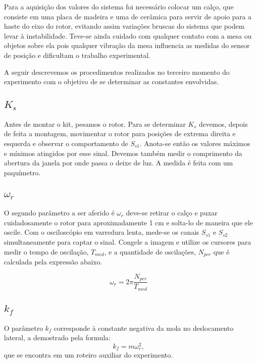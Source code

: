 Para a aquisição dos valores do sistema foi necessário colocar um calço, que consiste em uma placa de madeira e uma de cerâmica para servir de apoio para a haste do eixo do rotor, evitando assim variações bruscas do sistema que podem levar à instabilidade. Teve-se ainda cuidado com qualquer contato com a mesa ou objetos sobre ela pois qualquer vibração da mesa influencia as medidas do sensor de posição e dificultam o trabalho experimental.

A seguir descrevemos os procedimentos realizados no terceiro momento
do experimento com o objetivo de se determinar as constantes envolvidas.

\subsection{$K_s$}



Antes de montar o kit, pesamos o rotor.
Para se determinar $K_s$ devemos, depois de feita a montagem, movimentar o rotor para posições de extrema direita e esquerda e observar o comportamento de $S_{s1}$. Anota-se então os valores máximos e mínimos atingidos por esse sinal. Devemos também medir
o comprimento da abertura da janela por onde passa o deixe de luz.
A medida é feita com um paquímetro.

\subsection{\texorpdfstring{$\omega_r$}{Lg}}
O segundo parâmetro a ser aferido é $\omega_r $ deve-se retirar o calço e puxar cuidadosamente o rotor para aproximadamente 1 cm e solta-lo de maneira que ele oscile. Com o osciloscópio em varredura lenta, mede-se os canais $ S_{s1} $ e $ S_{s2} $ simultaneamente para captar o sinal. Congele a imagem e utilize os cursores para medir o tempo de oscilação, $ T_{med} $, e a quantidade de oscilações, $ N_{per} $ que é calculada pela expressão abaixo.

\begin{equation}
    \omega_r = 2\pi\frac{N_{per}}{T_{med}}
\end{equation}

\subsection{$k_f$}
O parâmetro $ k_f $ corresponde à constante negativa da mola no deslocamento lateral, a demostrado pela formula:
\begin{equation}
    k_f = m\omega_r^2,
\end{equation}
que se encontra em um roteiro auxiliar do experimento.

